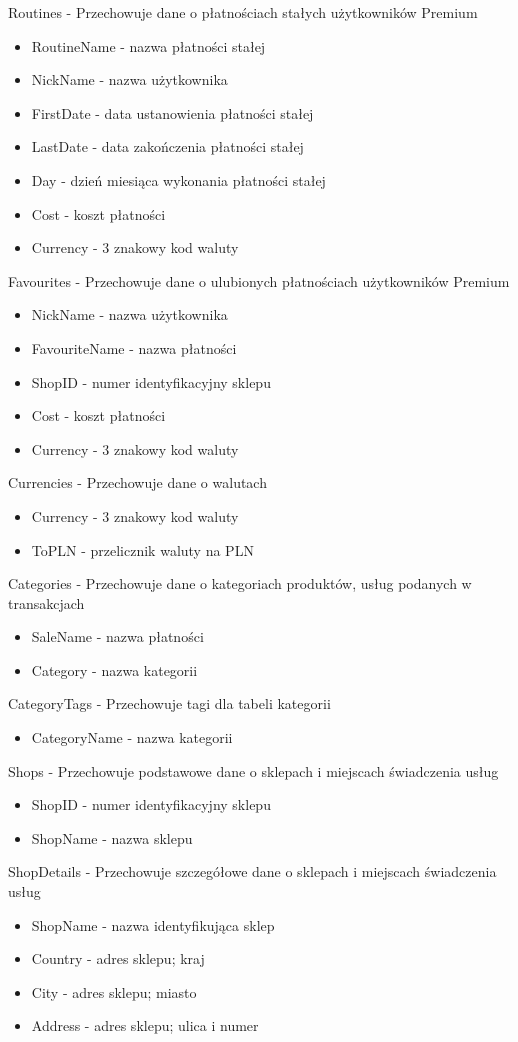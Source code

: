 \documentclass{article}
\begin{document}
    Routines - Przechowuje dane o płatnościach stałych użytkowników Premium
    \begin{itemize}
    \item RoutineName - nazwa płatności stałej
    \item NickName - nazwa użytkownika
    \item FirstDate - data ustanowienia płatności stałej
    \item LastDate - data zakończenia płatności stałej
    \item Day - dzień miesiąca wykonania płatności stałej
    \item Cost - koszt płatności
    \item Currency - 3 znakowy kod waluty
    \end{itemize}
    Favourites - Przechowuje dane o ulubionych płatnościach użytkowników Premium
    \begin{itemize}
    \item NickName - nazwa użytkownika
    \item FavouriteName - nazwa płatności
    \item ShopID - numer identyfikacyjny sklepu
    \item Cost - koszt płatności
    \item Currency - 3 znakowy kod waluty
    \end{itemize}
    Currencies - Przechowuje dane o walutach
    \begin{itemize}
    \item Currency - 3 znakowy kod waluty
    \item ToPLN - przelicznik waluty na PLN
    \end{itemize}
    Categories - Przechowuje dane o kategoriach produktów, usług podanych w transakcjach
    \begin{itemize}
    \item SaleName - nazwa płatności
    \item Category - nazwa kategorii
    \end{itemize}
    CategoryTags - Przechowuje tagi dla tabeli kategorii
    \begin{itemize}
    \item CategoryName - nazwa kategorii
    \end{itemize}
    Shops - Przechowuje podstawowe dane o sklepach i miejscach świadczenia usług
    \begin{itemize}
    \item ShopID - numer identyfikacyjny sklepu
    \item ShopName - nazwa sklepu
    \end{itemize}
    ShopDetails - Przechowuje szczegółowe dane o sklepach i miejscach świadczenia usług
    \begin{itemize}
    \item ShopName - nazwa identyfikująca sklep
    \item Country - adres sklepu; kraj
    \item City - adres sklepu; miasto
    \item Address - adres sklepu; ulica i numer
    \end{itemize}
    
\end{document}
